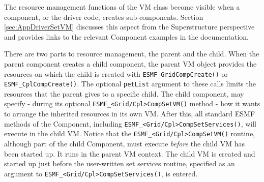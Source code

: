 The resource management functions of the VM class become visible when a component, or the driver code, creates sub-components. Section \ref{sec:AppDriverSetVM} discusses this aspect from the Superstructure 
perspective and provides links to the relevant Component examples in the documentation.

There are two parts to resource management, the parent and the child. When the parent component creates a child component, the parent VM object provides the resources on which the child is created with {\tt ESMF\_GridCompCreate()} or {\tt ESMF\_CplCompCreate()}. The optional {\tt petList} argument to these calls limits the resources that the parent gives to a specific child. The child component, may specify - during its optional 
{\tt ESMF\_<Grid/Cpl>CompSetVM()} method - how it wants to arrange the inherited resources in its own VM. After this, all standard ESMF methods of the Component, including {\tt ESMF\_<Grid/Cpl>CompSetServices()}, will execute in the child VM. Notice that the {\tt ESMF\_<Grid/Cpl>CompSetVM()} routine, although part of the child Component, must execute {\em before} the child VM has been started up. It runs in the parent VM context. The child VM is created and started up just before the user-written set services routine, specified as an argument to {\tt ESMF\_<Grid/Cpl>CompSetServices()}, is entered.
